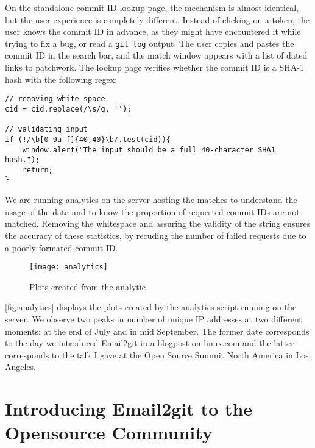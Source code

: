 On the standalone commit ID lookup page, the mechanism is almost identical, but the user experience is completely different. Instead of clicking on a token, the user knows the commit ID in advance, as they might have encountered it while trying to fix a bug, or read a \texttt{git log} output. The user copies and pastes the commit ID in the search bar, and the match window appears with a list of dated links to patchwork. The lookup page verifies whether the commit ID is a SHA-1 hash with the following regex:

\begin{lstlisting}
// removing white space
cid = cid.replace(/\s/g, '');

// validating input
if (!/\b[0-9a-f]{40,40}\b/.test(cid)){
    window.alert("The input should be a full 40-character SHA1 hash.");
    return;
}
\end{lstlisting}

We are running analytics on the server hosting the matches to understand the usage of the data and to know the proportion of requested commit IDs are not matched. Removing the whitespace and assuring the validity of the string ensures the accuracy of these statistics, by recuding the number of failed requests due to a poorly formated commit ID.

 \begin{figure}[htb]
\centering
\texttt{[image: analytics]}
\caption{Plots created from the analytic}
\label{fig:analytics}
\end{figure}

\autoref{fig:analytics} displays the plots created by the analytics script running on the server. We observe two peaks in number of unique IP addresses at two different moments: at the end of July and in mid September. The former date corresponds to the day we introduced Email2git in a blogpost on linux.com and the latter corresponds to the talk I gave at the Open Source Summit North America in Los Angeles. 



\section{Introducing Email2git to the Opensource Community}

